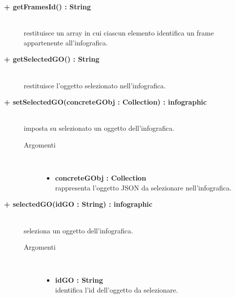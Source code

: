 \begin{description}
\begin{description}
		\item[\textbf{\color{blue}+ getFramesId() : String			}] \hfill \\
			restituisce un array in cui ciascun elemento identifica un frame appartenente all'infografica.

\end{description}

\begin{description}
		\item[\textbf{\color{blue}+ getSelectedGO() : String			}] \hfill \\
			restituisce l'oggetto selezionato nell'infografica.

\end{description}

\begin{description}
		\item[\textbf{\color{blue}+ setSelectedGO(concreteGObj : Collection) : infographic			}] \hfill \\
			imposta su selezionato un oggetto dell'infografica.

		\begin{description}
			\item[Argomenti] \hfill \\
				\begin{itemize}
				
					\item \textbf{concreteGObj : Collection			} \hfill \\
					rappresenta l'oggetto JSON da selezionare nell'infografica.
				\end{itemize}
		\end{description}

\end{description}

\begin{description}
		\item[\textbf{\color{blue}+ selectedGO(idGO : String) : infographic			}] \hfill \\
			seleziona un oggetto dell'infografica.

		\begin{description}
			\item[Argomenti] \hfill \\
				\begin{itemize}
				
					\item \textbf{idGO : String			} \hfill \\
					identifica l'id dell'oggetto da selezionare.
				\end{itemize}
		\end{description}


\end{description}
\end{description}

